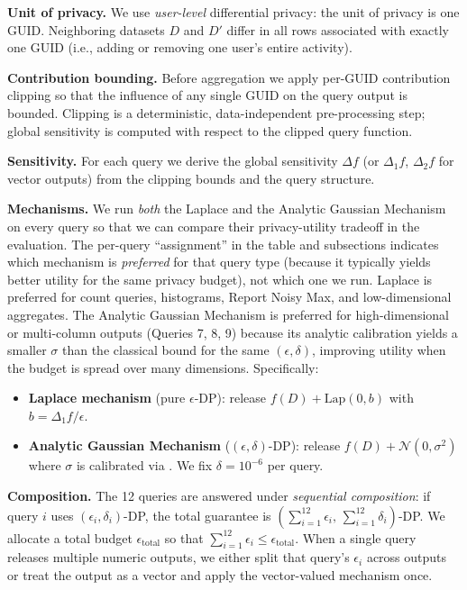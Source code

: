 \documentclass[12pt,letterpaper]{article}
\begin{document}
\textbf{Unit of privacy.} We use \emph{user-level} differential privacy: the unit of privacy is one GUID. Neighboring datasets $D$ and $D'$ differ in all rows associated with exactly one GUID (i.e., adding or removing one user's entire activity).

\textbf{Contribution bounding.} Before aggregation we apply per-GUID contribution clipping so that the influence of any single GUID on the query output is bounded. Clipping is a deterministic, data-independent pre-processing step; global sensitivity is computed with respect to the clipped query function.

\textbf{Sensitivity.} For each query we derive the global sensitivity $\Delta f$ (or $\Delta_1 f$, $\Delta_2 f$ for vector outputs) from the clipping bounds and the query structure.

\textbf{Mechanisms.} We run \emph{both} the Laplace and the Analytic Gaussian Mechanism on every query so that we can compare their privacy-utility tradeoff in the evaluation. The per-query ``assignment'' in the table and subsections indicates which mechanism is \emph{preferred} for that query type (because it typically yields better utility for the same privacy budget), not which one we run. Laplace is preferred for count queries, histograms, Report Noisy Max, and low-dimensional aggregates. The Analytic Gaussian Mechanism is preferred for high-dimensional or multi-column outputs (Queries 7, 8, 9) because its analytic calibration yields a smaller $\sigma$ than the classical bound for the same $(\epsilon,\delta)$, improving utility when the budget is spread over many dimensions. Specifically:
\begin{itemize}
    \item \textbf{Laplace mechanism} (pure $\epsilon$-DP): release $f(D) + \text{Lap}(0, b)$ with $b = \Delta_1 f / \epsilon$.
    \item \textbf{Analytic Gaussian Mechanism} ($(\epsilon,\delta)$-DP): release $f(D) + \mathcal{N}(0, \sigma^2)$ where $\sigma$ is calibrated via \cite{balle2018improving}. We fix $\delta = 10^{-6}$ per query.
\end{itemize}

\textbf{Composition.} The 12 queries are answered under \emph{sequential composition}: if query $i$ uses $(\epsilon_i, \delta_i)$-DP, the total guarantee is $(\sum_{i=1}^{12} \epsilon_i,\, \sum_{i=1}^{12} \delta_i)$-DP. We allocate a total budget $\epsilon_{\text{total}}$ so that $\sum_{i=1}^{12} \epsilon_i \leq \epsilon_{\text{total}}$. When a single query releases multiple numeric outputs, we either split that query's $\epsilon_i$ across outputs or treat the output as a vector and apply the vector-valued mechanism once.
\end{document}

